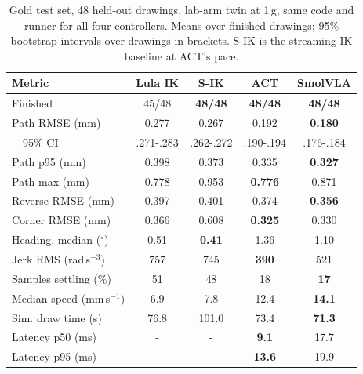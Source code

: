 \documentclass[conference]{IEEEtran}
\begin{document}
\begin{table}[t]
\centering
\caption{Gold test set, 48 held-out drawings, lab-arm twin at 1\,g, same code and runner for all four
controllers. Means over finished drawings; 95\% bootstrap intervals over drawings in brackets. S-IK is the
streaming IK baseline at ACT's pace.}
\label{tab:gold}
\setlength{\tabcolsep}{2.2pt}
\footnotesize
\begin{tabular}{lcccc}
\toprule
Metric & Lula IK & S-IK & ACT & SmolVLA \\
\midrule
Finished & 45/48 & \textbf{48/48} & \textbf{48/48} & \textbf{48/48} \\
Path RMSE (mm) & 0.277 & 0.267 & 0.192 & \textbf{0.180} \\
\ \ 95\% CI & .271-.283 & .262-.272 & .190-.194 & .176-.184 \\
Path p95 (mm) & 0.398 & 0.373 & 0.335 & \textbf{0.327} \\
Path max (mm) & 0.778 & 0.953 & \textbf{0.776} & 0.871 \\
Reverse RMSE (mm) & 0.397 & 0.401 & 0.374 & \textbf{0.356} \\
Corner RMSE (mm) & 0.366 & 0.608 & \textbf{0.325} & 0.330 \\
Heading, median ($^\circ$) & 0.51 & \textbf{0.41} & 1.36 & 1.10 \\
Jerk RMS (rad\,s$^{-3}$) & 757 & 745 & \textbf{390} & 521 \\
Samples settling (\%) & 51 & 48 & 18 & \textbf{17} \\
Median speed (mm\,s$^{-1}$) & 6.9 & 7.8 & 12.4 & \textbf{14.1} \\
Sim. draw time (s) & 76.8 & 101.0 & 73.4 & \textbf{71.3} \\
Latency p50 (ms) & - & - & \textbf{9.1} & 17.7 \\
Latency p95 (ms) & - & - & \textbf{13.6} & 19.9 \\
\bottomrule
\end{tabular}
\end{table}
\end{document}
